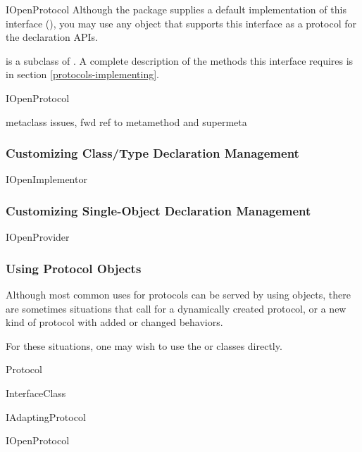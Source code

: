 \begin{verbatim%
}
\begin{verbatim%
}
\begin{verbatim%
}
\begin{verbatim%
}
\begin{classdesc*}{IOpenProtocol}
Although the  package supplies a default implementation of
this interface (), you may use any object that
supports this interface as a protocol for the declaration APIs.

 is a subclass of .  A complete
description of the methods this interface requires is in section
\ref{protocols-implementing}.
\end{classdesc*}

IOpenProtocol

metaclass issues, fwd ref to metamethod and supermeta


















\subsubsection{Customizing Class/Type Declaration Management}

IOpenImplementor

\subsubsection{Customizing Single-Object Declaration Management}

IOpenProvider

\subsubsection{Using Protocol Objects}
Although most common uses for protocols can be served by using 
objects, there are sometimes situations that call for a dynamically created
protocol, or a new kind of protocol with added or changed behaviors.

For these situations, one may wish to use the  or
 classes directly.

Protocol

InterfaceClass

IAdaptingProtocol

IOpenProtocol



















\end{verbatim%
}
\end{verbatim%
}
\end{verbatim%
}
\end{verbatim%
}
